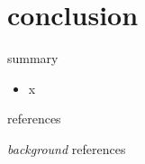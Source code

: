 \documentclass[svgnames,
               hyperref={colorlinks,citecolor=DeepPink4,linkcolor=FireBrick,urlcolor=Maroon},
               usepdftitle=false]  %
               {beamer}
\makeatletter
\newcommand\notsotiny{\@setfontsize\notsotiny\@viipt\@viiipt}
\makeatother
\begin{document}
\section{conclusion}

\begin{frame}{\alert{summary}}

\begin{itemize}
\item x
\end{itemize}
\end{frame}


\begin{frame}{references}

{\scriptsize

}
\end{frame}

\begin{frame}{\emph{background} references}

{\scriptsize

}
\end{frame}
\end{document}
